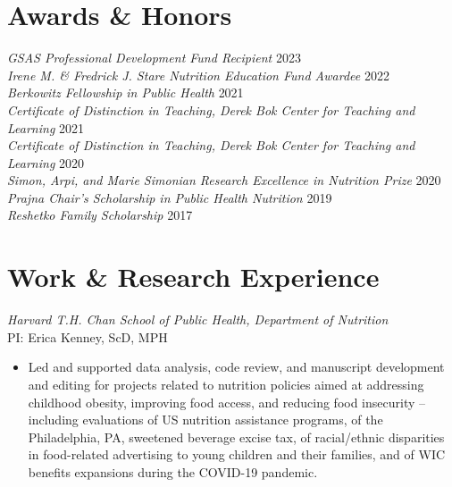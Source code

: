 \documentclass{cv_style}
\begin{document}

\section{Awards \& Honors}

\textit{GSAS Professional Development Fund Recipient} \hfill {2023}\\
\textit{Irene M. & Fredrick J. Stare Nutrition Education Fund Awardee} \hfill {2022}\\
\textit{Berkowitz Fellowship in Public Health} \hfill {2021}\\
\textit{Certificate of Distinction in Teaching, Derek Bok Center for Teaching and Learning} \hfill {2021}\\
\textit{Certificate of Distinction in Teaching, Derek Bok Center for Teaching and Learning} \hfill {2020}\\
\textit{Simon, Arpi, and Marie Simonian Research Excellence in Nutrition Prize} \hfill {2020} \\
\textit{Prajna Chair's Scholarship in Public Health Nutrition} \hfill 2019 \\
\textit{Reshetko Family Scholarship} \hfill 2017


\section{Work \& Research Experience}

\textit{Harvard T.H. Chan School of Public Health, Department of Nutrition} \\
PI: Erica Kenney, ScD, MPH
\begin{itemize}
    \item Led and supported data analysis, code review, and manuscript development and editing for projects related to nutrition policies aimed at addressing childhood obesity, improving food access, and reducing food insecurity -- including evaluations of US nutrition assistance programs, of the Philadelphia, PA, sweetened beverage excise tax, of racial/ethnic disparities in food-related advertising to young children and their families, and of WIC benefits expansions during the COVID-19 pandemic.
\end{itemize}
\end{document}
